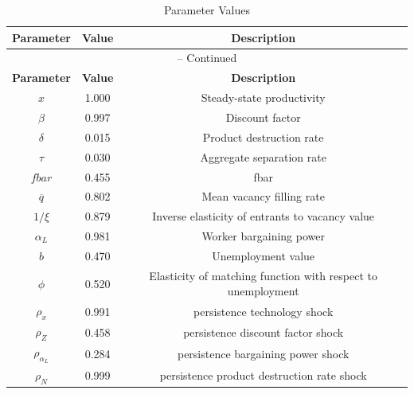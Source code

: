 \begin{center}
\begin{longtable}{ccc}
\caption{Parameter Values}\\%
\toprule%
\multicolumn{1}{c}{\textbf{Parameter}} &
\multicolumn{1}{c}{\textbf{Value}} &
 \multicolumn{1}{c}{\textbf{Description}}\\%
\midrule%
\endfirsthead
\multicolumn{3}{c}{{\tablename} \thetable{} -- Continued}\\%
\midrule%
\multicolumn{1}{c}{\textbf{Parameter}} &
\multicolumn{1}{c}{\textbf{Value}} &
  \multicolumn{1}{c}{\textbf{Description}}\\%
\midrule%
\endhead
${x}$ 	 & 	 1.000 	 & 	 Steady-state productivity\\
${\beta}$ 	 & 	 0.997 	 & 	 Discount factor\\
${\delta}$ 	 & 	 0.015 	 & 	 Product destruction rate\\
${\tau}$ 	 & 	 0.030 	 & 	 Aggregate separation rate\\
$fbar$ 	 & 	 0.455 	 & 	 fbar\\
${\overline{q}}$ 	 & 	 0.802 	 & 	 Mean vacancy filling rate\\
${1/\xi}$ 	 & 	 0.879 	 & 	 Inverse elasticity of entrants to vacancy value\\
$\alpha_L$ 	 & 	 0.981 	 & 	 Worker bargaining power\\
$b$ 	 & 	 0.470 	 & 	 Unemployment value\\
$\phi$ 	 & 	 0.520 	 & 	 Elasticity of matching function with respect to unemployment\\
${\rho_x}$ 	 & 	 0.991 	 & 	 persistence technology shock\\
${\rho_Z}$ 	 & 	 0.458 	 & 	 persistence discount factor shock\\
${\rho_{\alpha_L}}$ 	 & 	 0.284 	 & 	 persistence bargaining power shock\\
${\rho_N}$ 	 & 	 0.999 	 & 	 persistence product destruction rate shock\\
\bottomrule%
\end{longtable}
\end{center}
